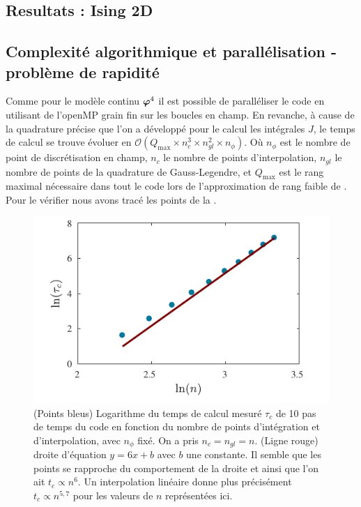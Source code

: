 \documentclass[10.5pt]{article}
\begin{document}
\begin{multicols}{2}
\section{Resultats : Ising 2D}
\label{sec:ResIsing}
\subsection{Complexité algorithmique et parallélisation - problème de rapidité} 


Comme pour le modèle continu $\boldsymbol{ \varphi}^4$ il est possible de paralléliser le code en utilisant de l'openMP \cite{openmp2002c++} grain fin sur les boucles en champ. En revanche, à cause de la quadrature précise que l'on a développé pour le calcul les intégrales $J$, le temps de calcul se trouve évoluer en $\mathcal{O}( Q_\text{max} \times n_c^3 \times n_{gl}^2 \times n_{\phi})$. Où $n_{\phi}$ est le nombre de point de discrétisation en champ, $n_c$ le nombre de points d'interpolation, $n_{{gl}}$ le nombre de points de la quadrature de Gauss-Legendre, et $Q_{\text{max}}$ est le rang maximal nécessaire dans tout le code lors de l'approximation de rang faible de . Pour le vérifier nous avons tracé les points de la .


\begin{figure}[H]
\begin{center}
	\includegraphics[width=0.95\columnwidth]{ComplexiteTemps.pdf}
\end{center}
\caption{(Points bleus) Logarithme du temps de calcul mesuré $\tau_c$ de 10 pas de temps du code en fonction du nombre de points d'intégration et d'interpolation, avec $n_\phi$ fixé. On a pris $n_c = n_{gl} = n$. (Ligne rouge) droite d'équation $y=6x+b$ avec $b$ une constante. Il semble que les points se rapproche du comportement de la droite et ainsi que l'on ait $t_c \propto n^6$. Un interpolation linéaire donne plus précisément $t_c \propto n^{5,7}$ pour les valeurs de $n$ représentées ici.}
\label{fig:timeNc}
\end{figure}



\end{multicols}
\end{document}
